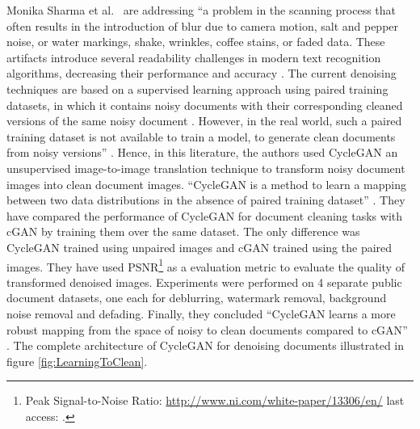 Monika Sharma et al.\ \cite{sharma2019learning} are addressing ``a problem in the scanning process that often results in the introduction of blur due to camera motion, salt and pepper noise, or water markings, shake, wrinkles, coffee stains, or faded data. These artifacts introduce several readability challenges in modern text recognition algorithms, decreasing their performance and accuracy \cite{sharma2019learning}. The current denoising techniques are based on a supervised learning approach using paired training datasets, in which it contains noisy documents with their corresponding cleaned versions of the same noisy document \cite{sharma2019learning}. However, in the real world, such a paired training dataset is not available to train a model, to generate clean documents from noisy versions'' \cite{zhu2020unpaired}\cite{sharma2019learning}. Hence, in this literature, the authors used \ac{CycleGAN} an unsupervised image-to-image translation technique to transform noisy document images into clean document images. ``\ac{CycleGAN} is a method to learn a mapping between two data distributions in the absence of paired training dataset'' \cite{zhu2020unpaired} \cite{sharma2019learning}. They have compared the performance of \ac{CycleGAN} for document cleaning tasks with \ac{cGAN} by training them over the same dataset. The only difference was \ac{CycleGAN} trained using unpaired images and \ac{cGAN} trained using the paired images. They have used \ac{PSNR}\footnote{Peak Signal-to-Noise Ratio: \url{http://www.ni.com/white-paper/13306/en/} last access: \dcdate.} as a evaluation metric to evaluate the quality of transformed denoised images. Experiments were performed on 4 separate public document datasets, one each for deblurring, watermark removal, background noise removal and defading. Finally, they concluded ``\ac{CycleGAN} learns a more robust mapping from the space of noisy to clean documents compared to \ac{cGAN}'' \cite{sharma2019learning}. The complete architecture of \ac{CycleGAN} for denoising documents illustrated in figure \ref{fig:LearningToClean}.


